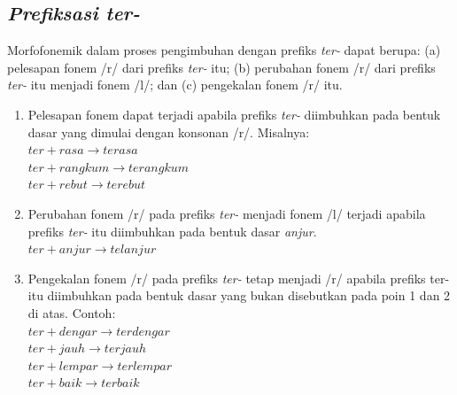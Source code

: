 \subsection{\textit{Prefiksasi ter-}}
\label{sec:prefiksasiTer-}

Morfofonemik dalam proses pengimbuhan dengan prefiks \textit{ter-} dapat berupa: (a) pelesapan fonem /r/ dari prefiks \textit{ter-} itu; (b) perubahan fonem /r/ dari prefiks \textit{ter-} itu menjadi fonem /l/; dan (c) pengekalan fonem /r/ itu. 

\begin{enumerate}
	\item Pelesapan fonem dapat terjadi apabila prefiks \textit{ter-} diimbuhkan pada bentuk dasar yang dimulai dengan konsonan /r/. Misalnya:\\
	$ter + rasa \rightarrow terasa$\\
	$ter + rangkum \rightarrow terangkum$\\
	$ter + rebut \rightarrow terebut$
	
	\item Perubahan fonem /r/ pada prefiks \textit{ter-} menjadi fonem /l/ terjadi apabila prefiks \textit{ter-} itu diimbuhkan pada bentuk dasar \textit{anjur}.\\
	$ter + anjur \rightarrow telanjur$
	
	\item Pengekalan fonem /r/ pada prefiks \textit{ter-} tetap menjadi /r/ apabila prefiks ter- itu diimbuhkan pada bentuk dasar yang bukan disebutkan pada poin 1 dan 2 di atas. Contoh:\\
	$ter + dengar \rightarrow terdengar$\\	
	$ter + jauh \rightarrow terjauh$\\
	$ter + lempar \rightarrow terlempar$\\
	$ter + baik \rightarrow terbaik$
	
\end{enumerate}
